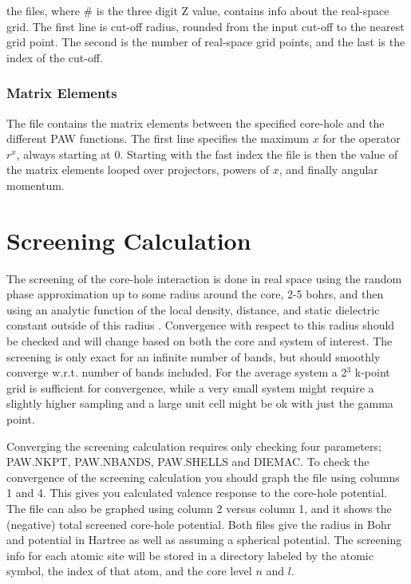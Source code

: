 \documentclass[11pt]{report}
\begin{document}
the  files, where \# is the three digit Z value, contains info about the real-space grid. The first line is cut-off radius, rounded from the input cut-off to the nearest grid point. The second is the number of real-space grid points, and the last is the index of the cut-off.

\subsection{Matrix Elements}

The  file contains the matrix elements between the specified core-hole and the different PAW functions. The first line specifies the maximum $x$ for the operator $r^x$, always starting at 0. Starting with the fast index the file is then the value of the matrix elements looped over projectors, powers of $x$, and finally angular momentum.

\chapter{Screening Calculation}
\label{screening}

The screening of the core-hole interaction is done in real space using the random phase approximation up to 
some radius around the core, 2-5 bohrs, and then using an analytic function of the local density, distance, 
and static dielectric constant outside of this radius \cite{screening}. Convergence with respect to this radius should be 
checked and will change based on both the core and system of interest. The screening is only exact for an 
infinite number of bands, but should smoothly converge w.r.t. number of bands included. For the average 
system a 2$^3$ k-point grid is sufficient for convergence, while a very small system might require a 
slightly higher sampling and a large unit cell might be ok with just the gamma point.

Converging the screening calculation requires only checking four parameters; PAW.NKPT, PAW.NBANDS, PAW.SHELLS and DIEMAC. To check the convergence of the screening calculation you should graph the file  using columns 1 and 4. This gives you calculated valence response to the core-hole potential. The file  can also be graphed using column 2 versus column 1, and it shows the (negative) total screened core-hole potential. Both files give the radius in Bohr and potential in Hartree as well as assuming a spherical potential. The screening info for each atomic site will be stored in a directory labeled by the atomic symbol, the index of that atom, and the core level $n$ and $l$.
\end{document}
